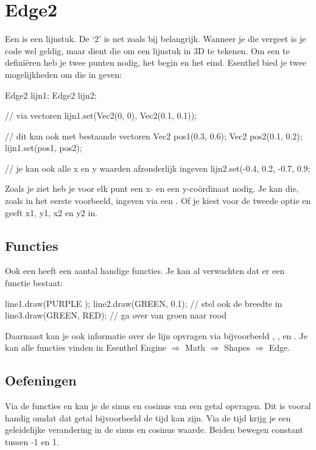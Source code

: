 \section{Edge2}
Een  is een lijnstuk. De `2' is net zoals bij  belangrijk. Wanneer je die vergeet is je code wel geldig, maar dient die om een lijnstuk in 3D te tekenen. Om een  te defini\"eren heb je twee punten nodig, het begin en het eind. Esenthel bied je twee mogelijkheden om die in geven:

\begin{code}
Edge2 lijn1;
Edge2 lijn2;

// via vectoren
lijn1.set(Vec2(0, 0), Vec2(0.1, 0.1));

// dit kan ook met bestaande vectoren
Vec2 pos1(0.3, 0.6);
Vec2 pos2(0.1, 0.2);
lijn1.set(pos1, pos2);

// je kan ook alle x en y waarden afzonderlijk ingeven
lijn2.set(-0.4, 0.2, -0.7, 0.9;
\end{code}

Zoals je ziet heb je voor elk punt een x- en een y-co\"ordinaat nodig. Je kan die, zoals in het eerste voorbeeld, ingeven via een . Of je kiest voor de tweede optie en geeft x1, y1, x2 en y2 in.

\subsection{Functies}
Ook een  heeft een aantal handige functies. Je kan al verwachten dat er een functie  bestaat:

\begin{code}
line1.draw(PURPLE    );
line2.draw(GREEN, 0.1); // stel ook de breedte in
line3.draw(GREEN, RED); // ga over van groen naar rood
\end{code}

Daarnaast kan je ook informatie over de lijn opvragen via bijvoorbeeld , ,  en . Je kan alle functies vinden in Esenthel Engine $\Rightarrow$ Math $\Rightarrow$ Shapes $\Rightarrow$ Edge.

\subsection{Oefeningen}

Via de functies  en  kan je de sinus en cosinus van een getal opvragen. Dit is vooral handig omdat dat getal bijvoorbeeld de tijd kan zijn. Via de tijd krijg je een geleidelijke verandering in de sinus en cosinus waarde. Beiden bewegen constant tussen -1 en 1. 

